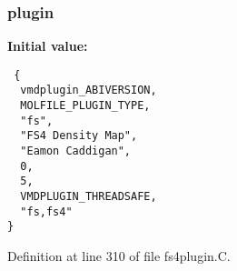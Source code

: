 \subsubsection{ plugin\hspace{0.3cm}{\tt  [static]}}\label{fs4plugin_8C_a1}


{\bf Initial value:}

\footnotesize\begin{verbatim} {
  vmdplugin_ABIVERSION,   
  MOLFILE_PLUGIN_TYPE,    
  "fs",                   
  "FS4 Density Map",      
  "Eamon Caddigan",       
  0,                      
  5,                      
  VMDPLUGIN_THREADSAFE,   
  "fs,fs4"                
}\end{verbatim}\normalsize 


Definition at line 310 of file fs4plugin.C.